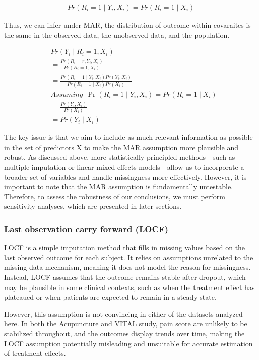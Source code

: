 \documentclass{article}
\begin{document}
\begin{align*}
  Pr(R_i=1 \mid Y_i, X_i) = Pr(R_i=1 \mid X_i)
  \end{align*}

Thus, we can infer under MAR, the distribution of outcome within
covaraites is the same in the observed data, the unobserved data, and
the population.

\begin{align*}
  & Pr(Y_i \mid R_i=1, X_i) \\ 
  & = \displaystyle \frac{Pr(R_i=r,Y_i,X_i)}{Pr(R_i=1,X_i)} \\
  & = \displaystyle \frac{Pr(R_i=1 \mid Y_i,X_i)Pr(Y_i,X_i)}{Pr(R_i=1 \mid X_i)Pr(X_i)} 
  \\
  & Assuming \ \ \Pr(R_i=1 \mid Y_i, X_i) = Pr(R_i=1 \mid X_i) \\
  & = \displaystyle \frac{Pr(Y_i,X_i)}{Pr(X_i)} \\
  & = Pr(Y_i \mid X_i)
  \end{align*}

The key issue is that we aim to include as much relevant information as
possible in the set of predictors X to make the MAR assumption more
plausible and robust. As discussed above, more statistically principled
methods---such as multiple imputation or linear mixed-effects
models---allow us to incorporate a broader set of variables and handle
missingness more effectively. However, it is important to note that the
MAR assumption is fundamentally untestable. Therefore, to assess the
robustness of our conclusions, we must perform sensitivity analyses,
which are presented in later sections.

\subsubsection{Last observation carry forward
(LOCF)}\label{last-observation-carry-forward-locf}

LOCF is a simple imputation method that fills in missing values based on
the last observed outcome for each subject. It relies on assumptions
unrelated to the missing data mechanism, meaning it does not model the
reason for missingness. Instead, LOCF assumes that the outcome remains
stable after dropout, which may be plausible in some clinical contexts,
such as when the treatment effect has plateaued or when patients are
expected to remain in a steady state.

However, this assumption is not convincing in either of the datasets
analyzed here. In both the Acupuncture and VITAL study, pain score are
unlikely to be stabilized throughout, and the outcomes display trends
over time, making the LOCF assumption potentially misleading and
unsuitable for accurate estimation of treatment effects.
\end{document}
